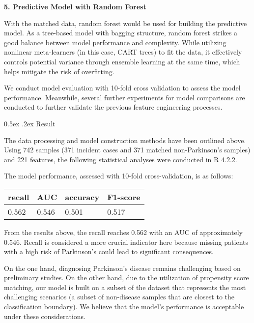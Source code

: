 \documentclass[12pt,]{article}
\makeatletter
\renewcommand\subsection{
  \@startsection{subsection}{2}{\z@}
    {-1.5ex\@plus -1ex \@minus -.2ex}%
    {0.5ex \@plus .2ex}%
    {\normalfont\normalsize\bf}} %
\makeatother
\begin{document}
\begin{enumerate}
  \textbf{5. Predictive Model with Random Forest}

  With the matched data, random forest would be used for building the
  predictive model. As a tree-based model with bagging structure, random
  forest strikes a good balance between model performance and
  complexity. While utilizing nonlinear meta-learners (in this case,
  CART trees) to fit the data, it effectively controls potential
  variance through ensemble learning at the same time, which helps
  mitigate the risk of overfitting.

  We conduct model evaluation with 10-fold cross validation to assess
  the model performance. Meanwhile, several further experiments for
  model comparisons are conducted to further validate the previous
  feature engineering processes.
\end{enumerate}

\hypertarget{result}{%
\subsection{Result}\label{result}}

The data processing and model construction methods have been outlined
above. Using 742 samples (371 incident cases and 371 matched
non-Parkinson's samples) and 221 features, the following statistical
analyses were conducted in R 4.2.2.

The model performance, assessed with 10-fold cross-validation, is as
follows:

\begin{longtable}[]{@{}llll@{}}
\toprule
recall & AUC & accuracy & F1-score \\
\midrule
\endhead
0.562 & 0.546 & 0.501 & 0.517 \\
\bottomrule
\end{longtable}

From the results above, the recall reaches 0.562 with an AUC of
approximately 0.546. Recall is considered a more crucial indicator here
because missing patients with a high risk of Parkinson's could lead to
significant consequences.

On the one hand, diagnosing Parkinson's disease remains challenging
based on preliminary studies. On the other hand, due to the utilization
of propensity score matching, our model is built on a subset of the
dataset that represents the most challenging scenarios (a subset of
non-disease samples that are closest to the classification boundary). We
believe that the model's performance is acceptable under these
considerations.
\end{document}
